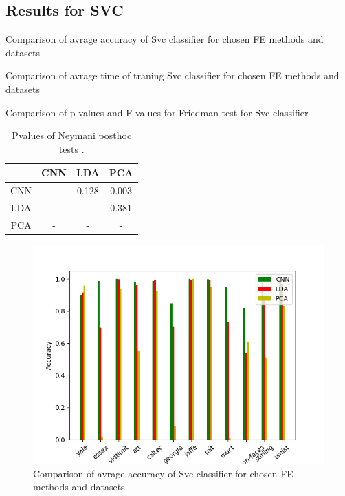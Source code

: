 \documentclass[a4paper, 10 pt, conference]{ieeeconf}
\begin{document}
\subsection{Results for SVC}


\begin{table}[!h]
    \centering
    \caption{Comparison of avrage accuracy of Svc classifier for chosen FE methods and datasets}
    
    \label{table:svm_acc_comparison}
\end{table}

\begin{table}[!h]
    \centering
    \caption{Comparison of avrage time of traning Svc classifier for chosen FE methods and datasets}
    
    \label{table:svm_fit_time_comparison}
\end{table}

\begin{table}[!h]
    \centering
    \caption{Comparison of p-values and F-values for Friedman test for Svc classifier}
    
    \label{table:svm_pvalues}
\end{table}

\begin{table}[!h]
    \centering
    \caption{Pvalues of Neymani posthoc tests .}
    \begin{tabular}{|c|c|c|c|}
         \hline
          & CNN & LDA & PCA \\
         \hline
         CNN &  - &  0.128 &  0.003 \\
         \hline
         LDA &  - & - &  0.381 \\
         \hline
         PCA &  - & - & - \\
         \hline
    \end{tabular}
    \label{tab:svm_posthoc_pvalues}
\end{table}

\begin{figure}[!h]
    \centering
    \includegraphics[scale=0.875]{images/Svm_accuracy_comparison.png}
    \caption{Comparison of avrage accuracy of Svc classifier for chosen FE methods and datasets}
    \label{fig:svm_acc_comparision}
\end{figure}
\end{document}
